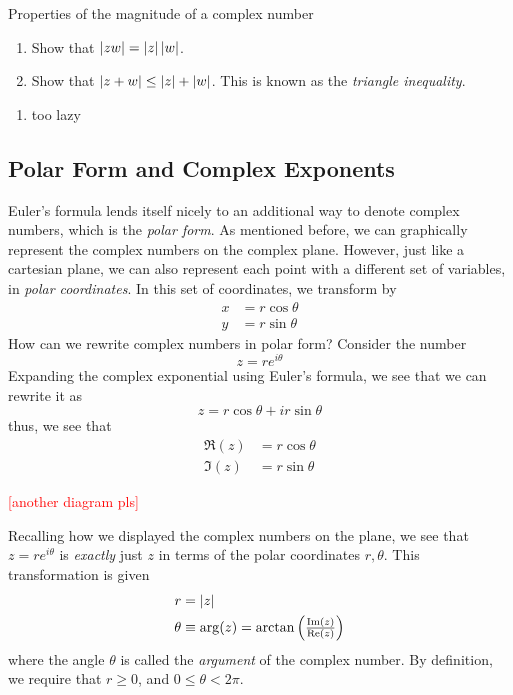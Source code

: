\begin{exercise}
	Properties of the magnitude of a complex number
	\begin{enumerate}[label = (\alph*)]
		\item Show that \(\left|zw\right| = \left|z\right|\left|w\right|\).
		\item Show that \(\left|z+w\right|\leq \left|z\right|+\left|w\right|\). This is known as the \emph{triangle inequality}.
	\end{enumerate}
\begin{solution}
	\begin{enumerate}[label = (\alph*)]
		\item too lazy		
	\end{enumerate}
\end{solution}
\end{exercise}

\subsection{Polar Form and Complex Exponents}
Euler's formula lends itself nicely to an additional way to denote complex numbers, which is the \emph{polar form}. As mentioned before, we can graphically represent the complex numbers on the complex plane. However, just like a cartesian plane, we can also represent each point with a different set of variables, in \emph{polar coordinates}. In this set of coordinates, we transform by
\begin{align*}
	x&=r\cos\theta\\
	y&=r\sin\theta
\end{align*}
How can we rewrite complex numbers in polar form? Consider the number
\[z = re^{i\theta}\]
Expanding the complex exponential using Euler's formula, we see that we can rewrite it as
\[z = r\cos\theta + ir\sin\theta\]
thus, we see that
\begin{subequations}
	\begin{align}
		\Re(z)&=r\cos\theta\\
		\Im(z)&=r\sin\theta
	\end{align}
\end{subequations}
\begin{center}
	\textcolor{red}{[another diagram pls]}	
\end{center}
Recalling how we displayed the complex numbers on the plane, we see that \(z=re^{i\theta}\) is \emph{exactly} just \(z\) in terms of the polar coordinates \(r,\theta\). This transformation is given
\begin{subequations}
	\begin{align}
		r &= \left|z\right|\\
		\theta &\equiv\arg(z) =  \arctan\left(\tfrac{\operatorname{Im}(z)}{\operatorname{Re}(z)}\right)
	\end{align}
\end{subequations}
where the angle \(\theta\) is called the \emph{argument} of the complex number. By definition, we require that \(r\geq 0\), and \(0\leq\theta<2\pi\).

